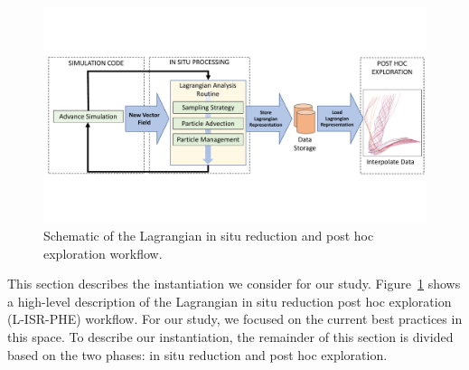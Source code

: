 \begin{figure}[!t]
\centering
\includegraphics[width=0.9\linewidth,trim={0cm 4.3cm 0cm 4.3cm}, clip ]{Images/Schematic.pdf}
\vspace{-2mm}
\caption{Schematic of the Lagrangian in situ reduction and post hoc exploration workflow.} %
\vspace{-7mm}
\label{fig:schematic}
\end{figure}

%

This section describes the instantiation we consider for our study.
%
Figure~\ref{fig:schematic} shows a high-level description of the Lagrangian in situ reduction post hoc exploration (L-ISR-PHE) workflow. 
%
%
For our study, we focused on the current best practices in this space.
%
To describe our instantiation, the remainder of this section is divided based on the two phases: in situ reduction and post hoc exploration. 
%

